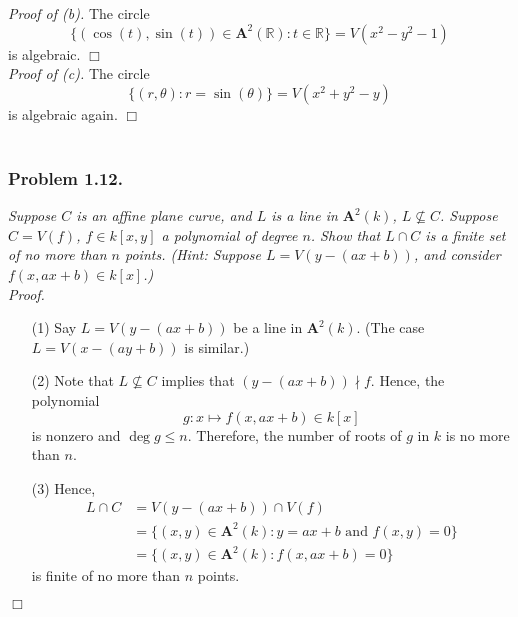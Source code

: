 \documentclass{article}
\begin{document}
\emph{Proof of (b).}
The circle
\[
  \{(\cos(t),\sin(t)) \in \mathbf{A}^2(\mathbb{R}) : t \in \mathbb{R} \} = V(x^2-y^2-1)
\]
is algebraic.
$\Box$ \\



\emph{Proof of (c).}
The circle
\[
  \{ (r,\theta) : r = \sin(\theta) \} = V(x^2+y^2-y)
\]
is algebraic again.
$\Box$ \\\\






\subsubsection*{Problem 1.12.}
\emph{Suppose $C$ is an affine plane curve,
and $L$ is a line in $\mathbf{A}^2(k)$,
$L \not\subseteq C$.
Suppose $C = V(f)$, $f \in k[x,y]$ a polynomial of degree $n$.
Show that $L \cap C$ is a finite set of no more than $n$ points.
(Hint: Suppose $L = V(y - (ax + b))$, and consider
$f(x,ax +b) \in k[x]$.)} \\

\emph{Proof.}
\begin{enumerate}
\item[(1)]
  Say $L = V(y - (ax + b))$ be a line in $\mathbf{A}^2(k)$.
  (The case $L = V(x - (ay + b))$ is similar.)

\item[(2)]
  Note that $L \not\subseteq C$ implies that $(y - (ax + b)) \nmid f$.
  Hence, the polynomial
  \[
    g: x \mapsto f(x,ax + b) \in k[x]
  \]
  is nonzero and $\deg g \leq n$.
  Therefore, the number of roots of $g$ in $k$ is no more than $n$.

\item[(3)]
  Hence,
  \begin{align*}
    L \cap C
    &= V(y - (ax + b)) \cap V(f) \\
    &= \{ (x,y) \in \mathbf{A}^2(k) : y = ax + b \text{ and } f(x,y) = 0 \} \\
    &= \{ (x,y) \in \mathbf{A}^2(k) : f(x,ax + b) = 0 \}
  \end{align*}
  is finite of no more than $n$ points.
\end{enumerate}
$\Box$ \\\\
\end{document}
